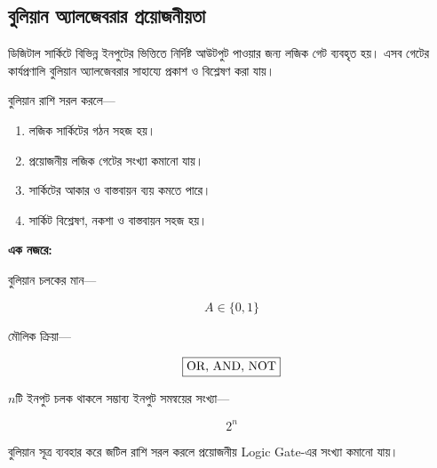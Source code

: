 \subsection{বুলিয়ান অ্যালজেবরার প্রয়োজনীয়তা}

ডিজিটাল সার্কিটে বিভিন্ন ইনপুটের ভিত্তিতে নির্দিষ্ট আউটপুট
পাওয়ার জন্য লজিক গেট ব্যবহৃত হয়।
এসব গেটের কার্যপ্রণালি বুলিয়ান অ্যালজেবরার সাহায্যে
প্রকাশ ও বিশ্লেষণ করা যায়।

বুলিয়ান রাশি সরল করলে—

\begin{enumerate}[leftmargin=*,itemsep=2pt]
    \item লজিক সার্কিটের গঠন সহজ হয়।
    \item প্রয়োজনীয় লজিক গেটের সংখ্যা কমানো যায়।
    \item সার্কিটের আকার ও বাস্তবায়ন ব্যয় কমতে পারে।
    \item সার্কিট বিশ্লেষণ, নকশা ও বাস্তবায়ন সহজ হয়।
\end{enumerate}

\par\begingroup

\textbf{এক নজরে:}

বুলিয়ান চলকের মান—

\[
A\in\{0,1\}
\]

মৌলিক ক্রিয়া—

\[
\boxed{
\text{\textenglish{OR,\ AND,\ NOT}}
}
\]

\(n\)টি ইনপুট চলক থাকলে সম্ভাব্য ইনপুট সমন্বয়ের সংখ্যা—

\[
\boxed{2^n}
\]

বুলিয়ান সূত্র ব্যবহার করে জটিল রাশি সরল করলে
প্রয়োজনীয় \textenglish{Logic Gate}-এর সংখ্যা কমানো যায়।
\par\endgroup





